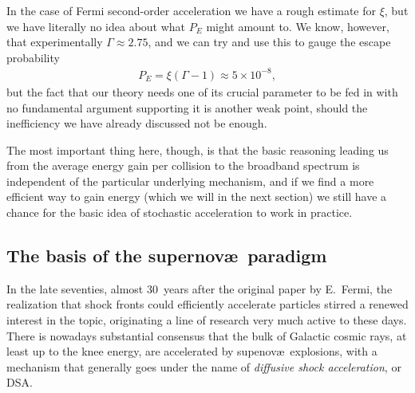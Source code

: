 In the case of Fermi second-order acceleration we have a rough estimate for $\xi$,
but we have literally no idea about what $P_E$ might amount to. We know, however,
that experimentally $\Gamma \approx 2.75$, and we can try and use this to gauge
the escape probability
\begin{align*}
  P_E = \xi (\Gamma - 1) \approx 5 \times 10^{-8},
\end{align*}
but the fact that our theory needs one of its crucial parameter to be fed in with
no fundamental argument supporting it is another weak point, should the inefficiency
we have already discussed not be enough.

The most important thing here, though, is that the basic reasoning leading us from
the average energy gain per collision to the broadband spectrum is independent of
the particular underlying mechanism, and if we find a more efficient way to gain
energy (which we will in the next section) we still have a chance for the basic
idea of stochastic acceleration to work in practice.


\subsection{The basis of the supernov\ae~paradigm}

In the late seventies, almost 30~years after the original paper by E.~Fermi, the
realization that shock fronts could efficiently accelerate particles stirred a renewed
interest in the topic, originating a line of research very much active to these days.
There is nowadays substantial consensus that the bulk of Galactic cosmic rays, at
least up to the knee energy, are accelerated by supenov\ae\ explosions, with a mechanism
that generally goes under the name of \emph{diffusive shock acceleration}, or DSA.

